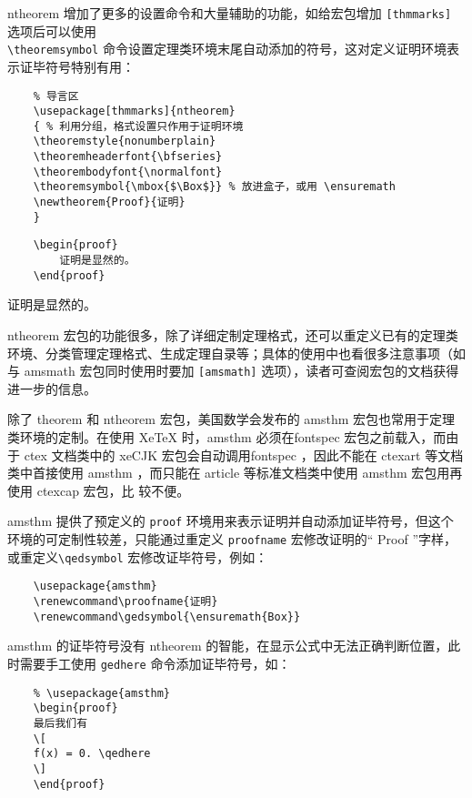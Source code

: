 ntheorem 增加了更多的设置命令和大量辅助的功能，如给宏包增加 \verb|[thmmarks]| 选项后可以使用\\ \verb|\theoremsymbol| 命令设置定理类环境末尾自动添加的符号，这对定义证明环境表示证毕符号特别有用：

\begin{lstlisting}
    % 导言区
    \usepackage[thmmarks]{ntheorem}
    { % 利用分组，格式设置只作用于证明环境
    \theoremstyle{nonumberplain}
    \theoremheaderfont{\bfseries}
    \theorembodyfont{\normalfont}
    \theoremsymbol{\mbox{$\Box$}} % 放进盒子，或用 \ensuremath
    \newtheorem{Proof}{证明}
    }
\end{lstlisting}

\begin{minipage}[t]{0.45\textwidth}
\begin{lstlisting}
    \begin{proof}
        证明是显然的。
    \end{proof}
\end{lstlisting}
\end{minipage}
\hfill
\begin{minipage}[t]{0.45\textwidth}
    \begin{Proof}
        证明是显然的。
    \end{Proof}
\end{minipage}

ntheorem 宏包的功能很多，除了详细定制定理格式，还可以重定义已有的定理类环境、分类管理定理格式、生成定理自录等；具体的使用中也看很多注意事项（如与 amsmath 宏包同时使用时要加 \verb|[amsmath]| 选项），读者可查阅宏包的文档获得进一步的信息。

除了 theorem 和 ntheorem 宏包，美国数学会发布的 amsthm 宏包也常用于定理类环境的定制。在使用 XeTeX 时，amsthm 必须在fontspec 宏包之前载入，而由于 ctex 文档类中的 xeCJK 宏包会自动调用fontspec ，因此不能在 ctexart 等文档类中首接使用 amsthm ，而只能在 article 等标准文档类中使用 amsthm 宏包用再使用 ctexcap 宏包，比
较不便。

amsthm 提供了预定义的 \verb|proof| 环境用来表示证明并自动添加证毕符号，但这个环境的可定制性较差，只能通过重定义 \verb|proofname| 宏修改证明的“ Proof ”字样，或重定义\verb|\qedsymbol| 宏修改证毕符号，例如：
\begin{lstlisting}
    \usepackage{amsthm}
    \renewcommand\proofname{证明}
    \renewcommand\gedsymbol{\ensuremath{Box}}
\end{lstlisting}


amsthm 的证毕符号没有 ntheorem 的智能，在显示公式中无法正确判断位置，此时需要手工使用 \verb|gedhere| 命令添加证毕符号，如：
\begin{lstlisting}
    % \usepackage{amsthm}
    \begin{proof}
    最后我们有
    \[
    f(x) = 0. \qedhere
    \]
    \end{proof}
\end{lstlisting}

